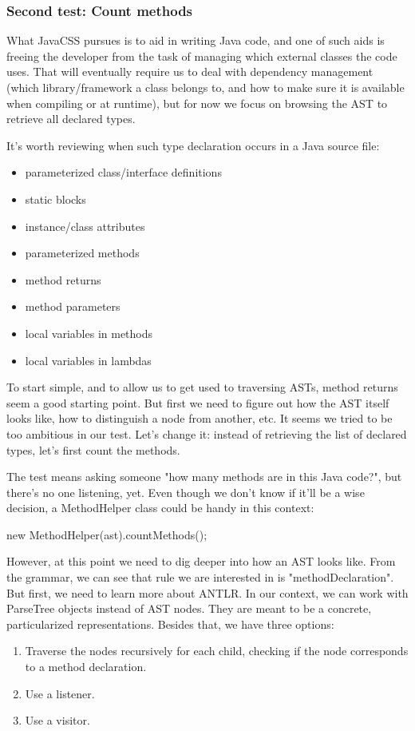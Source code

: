 \documentclass[11pt]{article}
\begin{document}
\subsubsection{Second test: Count methods}
\label{sec-1-3-2}

What JavaCSS pursues is to aid in writing Java code, and one of such aids is freeing the developer from the task of managing
which external classes the code uses. That will eventually require us to deal with dependency management
(which library/framework a class belongs to, and how to make sure it is available when compiling or at runtime), but for now
we focus on browsing the AST to retrieve all declared types.

It's worth reviewing when such type declaration occurs in a Java source file:
\begin{itemize}
\item parameterized class/interface definitions
\item static blocks
\item instance/class attributes
\item parameterized methods
\item method returns
\item method parameters
\item local variables in methods
\item local variables in lambdas
\end{itemize}

To start simple, and to allow us to get used to traversing ASTs, method returns seem a good starting point.
But first we need to figure out how the AST itself looks like, how to distinguish a node from another, etc.
It seems we tried to be too ambitious in our test. Let's change it: instead of retrieving the list of declared
types, let's first count the methods.

The test means asking someone "how many methods are in this Java code?", but there's no one listening, yet.
Even though we don't know if it'll be a wise decision, a MethodHelper class could be handy in this context:

new MethodHelper(ast).countMethods();

However, at this point we need to dig deeper into how an AST looks like. From the grammar, we can see that rule we are
interested in is "methodDeclaration". But first, we need to learn more about ANTLR. In our context, we
can work with ParseTree objects instead of AST nodes. They are meant to be a concrete, particularized representations.
Besides that, we have three options:
\begin{enumerate}
\item Traverse the nodes recursively for each child, checking if the node corresponds to a method declaration.
\item Use a listener.
\item Use a visitor.
\end{enumerate}
\end{document}
